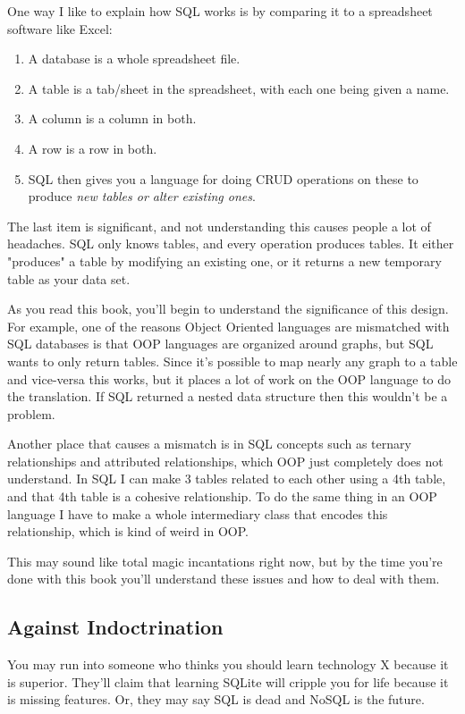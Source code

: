 One way I like to explain how SQL works is by comparing it to a spreadsheet 
software like Excel:

\begin{enumerate}
\item A database is a whole spreadsheet file.
\item A table is a tab/sheet in the spreadsheet, with each one being given a name.
\item A column is a column in both.
\item A row is a row in both.
\item SQL then gives you a language for doing CRUD operations on these to 
    produce \emph{new tables or alter existing ones}.
\end{enumerate}

The last item is significant, and not understanding this causes people a lot of headaches.
SQL only knows tables, and every operation produces tables.  It either "produces" a table
by modifying an existing one, or it returns a new temporary table as your data set.

As you read this book, you'll begin to understand the significance of this design.  For
example, one of the reasons Object Oriented languages are mismatched with SQL databases
is that OOP languages are organized around graphs, but SQL wants to only return tables.
Since it's possible to map nearly any graph to a table and vice-versa this works, but
it places a lot of work on the OOP language to do the translation.  If SQL returned
a nested data structure then this wouldn't be a problem.

Another place that causes a mismatch is in SQL concepts such as ternary
relationships and attributed relationships, which OOP just completely does not
understand.  In SQL I can make 3 tables related to each other using a 4th
table, and that 4th table is a cohesive relationship.  To do the same thing in
an OOP language I have to make a whole intermediary class that encodes this
relationship, which is kind of weird in OOP.

This may sound like total magic incantations right now, but by the time you're
done with this book you'll understand these issues and how to deal with them.

\subsection*{Against Indoctrination}

You may run into someone who thinks you should learn technology X because 
it is superior.  They'll claim that learning SQLite will cripple you for
life because it is missing features.  Or, they may say SQL is dead and
NoSQL is the future.

